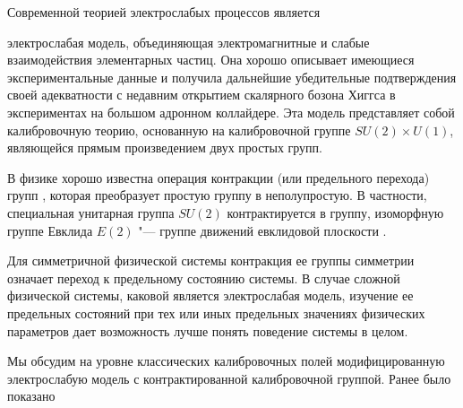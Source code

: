 


\date{14/XI/2014} %










\makerutitle





Современной теорией электрослабых процессов является \linebreak

электрослабая модель, объединяющая электромагнитные и слабые взаимодействия элементарных частиц. Она хорошо описывает имеющиеся экспериментальные данные и получила дальнейшие убедительные подтверждения своей адекватности с недавним открытием скалярного бозона Хиггса в экспериментах на большом адронном коллайдере. Эта модель представляет собой калибровочную теорию, основанную на калибровочной группе $ SU(2)\times U(1)$, являющейся прямым произведением двух простых групп.

В физике хорошо известна операция контракции (или предельного перехода) групп \cite{gromov:IW-53}, которая преобразует простую группу в неполупростую. В частности, специальная унитарная группа $ SU(2)$ контрактируется в группу, изоморфную группе Евклида $E(2)$ "--- группе движений евклидовой плоскости \cite{gromov:Gr-12}.

Для симметричной физической системы контракция ее группы симметрии означает переход к предельному состоянию системы. В случае сложной физической системы, каковой является электрослабая модель, изучение ее предельных состояний при тех или иных предельных значениях физических параметров дает возможность лучше понять поведение системы в целом.




Мы обсудим на уровне классических калибровочных полей модифицированную электрослабую модель с контрактированной калибровочной группой. Ранее было показано

